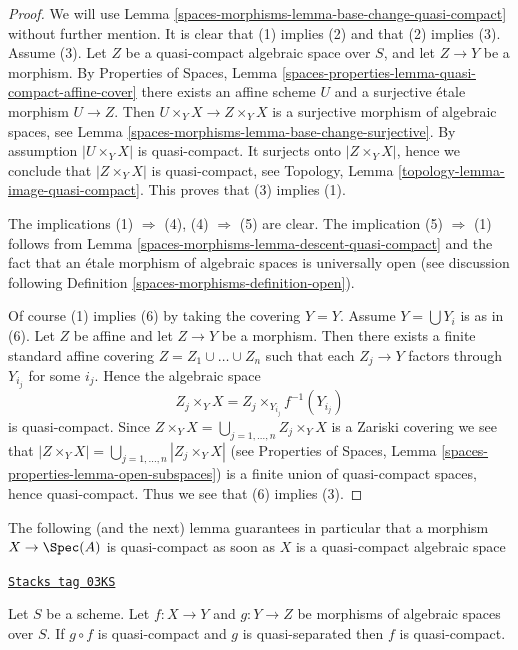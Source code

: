 \begin{proof}
We will use Lemma \ref{spaces-morphisms-lemma-base-change-quasi-compact}
without further mention.
It is clear that (1) implies (2) and that (2) implies (3).
Assume (3). Let $Z$ be a quasi-compact algebraic space over $S$,
and let $Z \to Y$ be a morphism. By
Properties of Spaces, Lemma
\ref{spaces-properties-lemma-quasi-compact-affine-cover}
there exists an affine scheme $U$ and a surjective \'etale morphism
$U \to Z$. Then $U \times_Y X \to Z \times_Y X$ is a surjective
morphism of algebraic spaces, see
Lemma \ref{spaces-morphisms-lemma-base-change-surjective}.
By assumption $|U \times_Y X|$ is quasi-compact. It surjects
onto $|Z \times_Y X|$, hence we conclude that $|Z \times_Y X|$
is quasi-compact, see
Topology, Lemma \ref{topology-lemma-image-quasi-compact}.
This proves that (3) implies (1).

\medskip\noindent
The implications (1) $\Rightarrow$ (4), (4) $\Rightarrow$ (5) are clear.
The implication (5) $\Rightarrow$ (1) follows from
Lemma \ref{spaces-morphisms-lemma-descent-quasi-compact}
and the fact that an \'etale morphism of algebraic spaces is universally open
(see discussion following
Definition \ref{spaces-morphisms-definition-open}).

\medskip\noindent
Of course (1) implies (6) by taking the covering $Y = Y$.
Assume $Y = \bigcup Y_i$ is as in (6). Let $Z$ be affine and let
$Z \to Y$ be a morphism. Then there exists a finite standard affine
covering $Z = Z_1 \cup \ldots \cup Z_n$ such that each $Z_j \to Y$
factors through $Y_{i_j}$ for some $i_j$. Hence the algebraic space
$$
Z_j \times_Y X = Z_j \times_{Y_{i_j}} f^{-1}(Y_{i_j})
$$
is quasi-compact. Since
$Z \times_Y X = \bigcup_{j = 1, \ldots, n} Z_j \times_Y X$
is a Zariski covering we see that
$|Z \times_Y X| = \bigcup_{j = 1, \ldots, n} |Z_j \times_Y X|$
(see Properties of Spaces, Lemma \ref{spaces-properties-lemma-open-subspaces})
is a finite union of quasi-compact spaces, hence quasi-compact.
Thus we see that (6) implies (3).
\end{proof}

The following (and the next) lemma guarantees in particular that a morphism
$X \to \Spec(A)$ is quasi-compact as soon as
$X$ is a quasi-compact algebraic space

\begin{lemma}
\label{spaces-morphisms-lemma-quasi-compact-permanence}
\href{https://stacks.math.columbia.edu/tag/03KS}{\texttt{Stacks tag 03KS}}

Let $S$ be a scheme.
Let $f : X \to Y$ and $g : Y \to Z$ be morphisms of algebraic spaces over $S$.
If $g \circ f$ is quasi-compact and $g$ is quasi-separated
then $f$ is quasi-compact.
\end{lemma}

